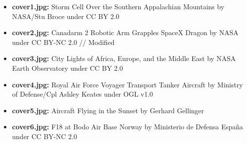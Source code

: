 \begin{itemize}
    \item \textbf{cover1.jpg:} Storm Cell Over the Southern Appalachian Mountains by NASA/Stu Broce under CC BY 2.0
    \item \textbf{cover2.jpg:} Canadarm 2 Robotic Arm Grapples SpaceX Dragon by NASA under CC BY-NC 2.0 // Modified
    \item \textbf{cover3.jpg:} City Lights of Africa, Europe, and the Middle East by NASA Earth Observatory under CC BY 2.0
    \item \textbf{cover4.jpg:} Royal Air Force Voyager Transport Tanker Aircraft by Ministry of Defense/Cpl Ashley Keates under OGL v1.0
    \item \textbf{cover5.jpg:} Aircraft Flying in the Sunset by Gerhard Gellinger
    \item \textbf{cover6.jpg:} F18 at Bodo Air Base Norway by Ministerio de Defensa España under CC BY-NC 2.0
\end{itemize}
